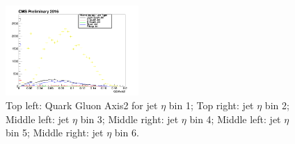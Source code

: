\begin{figure}[htbp]
\begin{center}
  \includegraphics[width=0.45\textwidth]{sections/mc4/TopTagger/figures/_b_qgaxis2jetetabin5_.png}
 \end{center}
 \caption{Top left: Quark Gluon Axis2 for jet $\eta$ bin 1; Top right: jet $\eta$ bin 2; Middle left: jet $\eta$ bin 3; Middle right: jet $\eta$ bin 4; Middle left: jet $\eta$ bin 5; Middle right: jet $\eta$ bin 6.}
 \label{fig:c4ttqgaxis2jeteta}
\end{figure}

